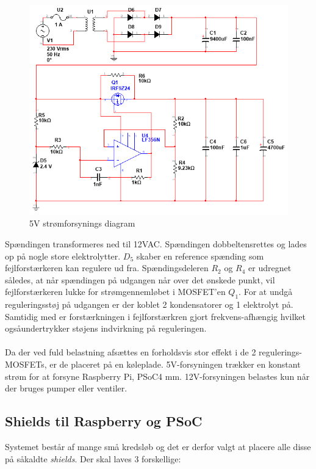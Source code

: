 \begin{figure}[H]
	\centering
	\includegraphics[scale=0.75]{../Hardware/PSU/PSU_5V}
	\caption{5V strømforsynings diagram}
	\label{photo:PSU_5V}
\end{figure}

Spændingen transformeres ned til 12VAC. Spændingen dobbeltensrettes og lades op på nogle store elektrolytter. $D_5$ skaber en reference spænding som fejlforstærkeren kan regulere ud fra. Spændingsdeleren $R_2$ og $R_4$ er udregnet således, at når spændingen på udgangen når over det ønskede punkt, vil fejlforstærkeren lukke for strømgennemløbet i MOSFET'en $Q_1$. For at undgå reguleringsstøj på udgangen er der koblet 2 kondensatorer og 1 elektrolyt på. Samtidig med er forstærkningen i fejlforstærkren gjort frekvens-afhængig hvilket ogsåundertrykker støjens indvirkning på reguleringen.
\\\\
Da der ved fuld belastning afsættes en forholdsvis stor effekt i de 2 regulerings-MOSFETs, er de placeret på en køleplade. 5V-forsyningen trækker en konstant strøm for at forsyne Raspberry Pi, PSoC4 mm. 12V-forsyningen belastes kun når der bruges pumper eller ventiler.

\subsection{Shields til Raspberry og PSoC}
Systemet består af mange små kredsløb og det er derfor valgt at placere alle disse på såkaldte \emph{shields}. Der skal laves 3 forskellige:

